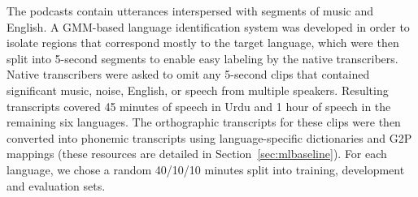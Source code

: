 The podcasts contain utterances interspersed with segments of music
and English. A GMM-based language identification system was
developed in order to isolate
regions that correspond mostly to the target language, which
were then split into 5-second
segments to enable easy labeling by the native transcribers.
Native transcribers were asked to omit any 5-second
clips that contained significant music, noise, English,
or speech from multiple speakers. Resulting transcripts
covered 45 minutes of speech in Urdu and 1
hour of speech in the remaining six languages. The orthographic
transcripts for these clips were then converted into phonemic
transcripts using language-specific dictionaries and G2P mappings
(these resources are detailed in Section~\ref{sec:mlbaseline}). For
each language, we chose a random 40/10/10 minutes split into training,
development and evaluation sets.
